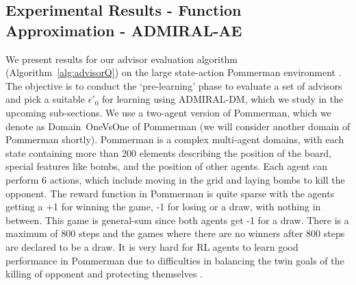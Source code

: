 \documentclass[jair, twoside,11pt,theapa]{article}
\begin{document}
%














\subsection{Experimental Results - Function Approximation - ADMIRAL-AE}\label{sec:experimentswithmaeqlee}


 We present results for our advisor evaluation algorithm (Algorithm~\ref{alg:advisorQ}) on the large state-action Pommerman environment \citep{resnick2018pommerman}. The objective is to conduct the `pre-learning' phase to evaluate a set of advisors and pick a suitable $\epsilon'_0$ for learning using ADMIRAL-DM, which we  study in the upcoming sub-sections. We  use a two-agent version of Pommerman, which we denote as Domain~OneVsOne of Pommerman (we will consider another domain of Pommerman shortly). Pommerman is a complex multi-agent domains, with each state containing more than 200 elements describing the position of the board, special features like bombs, and the position of other agents. Each agent can perform 6 actions, which include moving in the grid and laying bombs to kill the opponent. The reward function in Pommerman is quite sparse with the agents getting a +1 for winning the game, -1 for losing or a draw, with nothing in between. This game is general-sum since both agents get -1 for a draw. There is a maximum of 800 steps and the games where there are no winners after 800 steps are declared to be a draw. It is very hard for RL agents to learn good performance in Pommerman due to difficulties in balancing the twin goals of the killing of opponent and protecting themselves \citep{gao2019hard}. 
\end{document}
